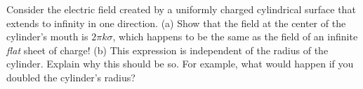         Consider the electric field created by a uniformly
        charged cylindrical surface that extends to infinity in one direction.\hwendpart
        (a) Show that the
        field at the center of the cylinder's mouth is $2\pi k\sigma$, 
        which happens to be the same as the field of an infinite \emph{flat}
        sheet of charge!\hwendpart
        (b) This expression is independent of the radius of the
        cylinder. Explain why this should be so. For example, what
        would happen if you doubled the cylinder's radius?

